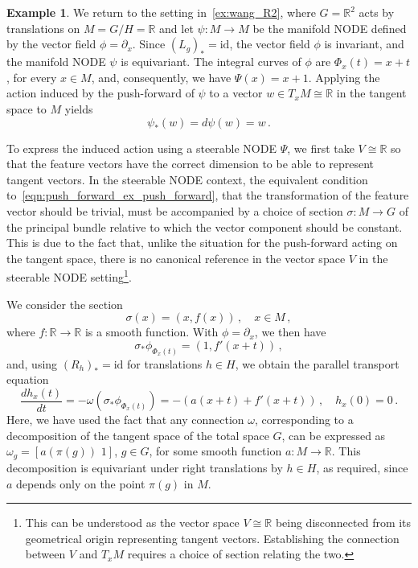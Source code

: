 \documentclass[12pt,a4paper]{article}
\numberwithin{equation}{section}
\newcommand{\id}{\mathrm{id}}
\newcommand{\R}{\mathbb{R}}
\theoremstyle{plain}
\theoremstyle{definition}
\newtheorem{example}[theorem]{Example}
\theoremstyle{remark}
\begin{document}
\begin{example}\label{ex:push_forward_R2}
We return to the setting in~\cref{ex:wang_R2}, where $G=\R^2$ acts by translations on $M=G/H = \R$ and let $\psi:M\to M$ be the manifold NODE defined by the vector field $\phi = \partial_x$. Since $(L_g)_* = \id$, the vector field $\phi$ is invariant, and the manifold NODE $\psi$ is equivariant. The integral curves of $\phi$ are $\Phi_x(t) = x+t$, for every $x\in M$, and, consequently, we have $\Psi(x) = x+1$. Applying the action induced by the push-forward of $\psi$ to a vector $w \in T_xM \cong \R$ in the tangent space to $M$ yields
\begin{equation}
\label{eqn:push_forward_ex_push_forward}
    \psi_*(w) = d\psi(w) = w \,.
\end{equation}

To express the induced action using a steerable NODE $\Psi$, we first take $V \cong \R$ so that the feature vectors have the correct dimension to be able to represent tangent vectors. In the steerable NODE context, the equivalent condition to~\eqref{eqn:push_forward_ex_push_forward}, that the transformation of the feature vector should be trivial, must be accompanied by a choice of section $\sigma:M\to G$ of the principal bundle relative to which the vector component should be constant. This is due to the fact that, unlike the situation for the push-forward acting on the tangent space, there is no canonical reference in the vector space $V$ in the steerable NODE setting\footnote{This can be understood as the vector space $V \cong \R$ being disconnected from its geometrical origin representing tangent vectors. Establishing the connection between $V$ and $T_xM$ requires a choice of section relating the two.}.

We consider the section
\begin{equation}
\label{eqn:push_forward_ex_section}
    \sigma(x) = (x,f(x)) \,, \quad x \in M \,,
\end{equation}
where $f:\R \to \R$ is a smooth function. With $\phi = \partial_x$, we then have
\begin{equation}
    \sigma_*\phi_{\Phi_x(t)} = (1,f'(x+t)) \,,
\end{equation}
and, using $(R_h)_* = \id$ for translations $h \in H$, we obtain the parallel transport equation
\begin{equation}
\label{eqn:push_forward_ex_parallel_transport}
    \frac{d h_x(t)}{dt} = -\omega(\sigma_* \phi_{\Phi_x(t)}) = -(a(x+t) + f'(x+t)) \,, \quad h_x(0)=0\,.
\end{equation}
Here, we have used the fact that any connection $\omega$, corresponding to a decomposition of the tangent space of the total space $G$, can be expressed as $\omega_g = [a(\pi(g))\,\,1]$, $g \in G$, for some smooth function $a : M \to \R$. This decomposition is equivariant under right translations by $h \in H$, as required, since $a$ depends only on the point $\pi(g)$ in $M$.


\end{example}
\end{document}
